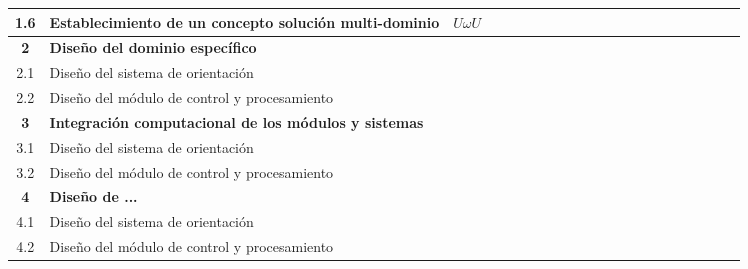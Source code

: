 \begin{table}[!ht]
{\begin{tabular}{clccccccccccccccccccc}
			        1.6         & Establecimiento de un concepto solución multi-dominio        & $U\omega U$ &                      & \cellcolor{colorIPN} &   &   &   &   &   &   &   &    &    &    &    &    &    &    &    &    \\ \midrule
			    \textbf{2}      & \textbf{Diseño del dominio específico}                       &             &                      &                      &   &   &   &   &   &   &   &    &    &    &    &    &    &    &    &    \\
			        2.1         & Diseño del sistema de orientación                            &             &                      &                      &   &   &   &   &   &   &   &    &    &    &    &    &    &    &    &    \\
			        2.2         & Diseño del módulo de control y procesamiento                 &             &                      &                      &   &   &   &   &   &   &   &    &    &    &    &    &    &    &    &    \\ \midrule
			    \textbf{3}      & \textbf{Integración computacional de los módulos y sistemas} &             &                      &                      &   &   &   &   &   &   &   &    &    &    &    &    &    &    &    &    \\
			        3.1         & Diseño del sistema de orientación                            &             &                      &                      &   &   &   &   &   &   &   &    &    &    &    &    &    &    &    &    \\
			        3.2         & Diseño del módulo de control y procesamiento                 &             &                      &                      &   &   &   &   &   &   &   &    &    &    &    &    &    &    &    &    \\ \midrule
			    \textbf{4}      & \textbf{Diseño de ...}                                       &             &                      &                      &   &   &   &   &   &   &   &    &    &    &    &    &    &    &    &    \\
			        4.1         & Diseño del sistema de orientación                            &             &                      &                      &   &   &   &   &   &   &   &    &    &    &    &    &    &    &    &    \\
			        4.2         & Diseño del módulo de control y procesamiento                 &             &                      &                      &   &   &   &   &   &   &   &    &    &    &    &    &    &    &    &    \\ \bottomrule
		\end{tabular}
	}
\end{table}

